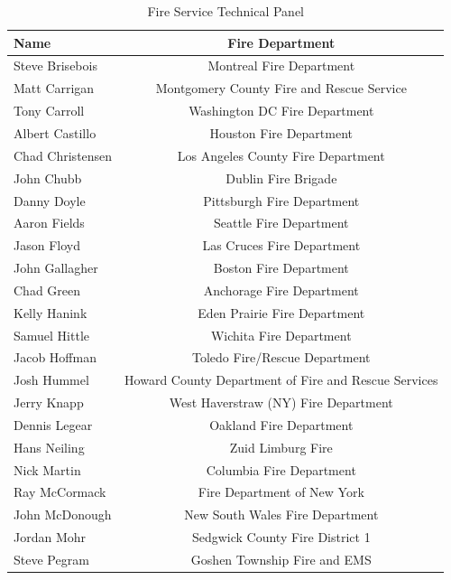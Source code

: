 \documentclass[12pt,oneside]{book}
\begin{document}
\begin{table}[!ht]
	\centering
	\caption*{Fire Service Technical Panel}
	\begin{tabular}{lc}
		\toprule[1.5pt]
		Name & Fire Department \\ 
		\hline
		Steve Brisebois  & Montreal Fire Department \\ 
		Matt Carrigan    & Montgomery County Fire and Rescue Service \\ 
		Tony Carroll     & Washington DC Fire Department \\ 
		Albert Castillo  & Houston Fire Department \\ 
		Chad Christensen & Los Angeles County Fire Department \\ 
		John Chubb       & Dublin Fire Brigade \\ 		 		  
		Danny Doyle      & Pittsburgh Fire Department \\ 
		Aaron Fields     & Seattle Fire Department \\ 
		Jason Floyd      & Las Cruces Fire Department \\ 
		John Gallagher   & Boston Fire Department \\ 
		Chad Green       & Anchorage Fire Department \\ 
		Kelly Hanink     & Eden Prairie Fire Department \\ 
		Samuel Hittle    & Wichita Fire Department \\ 
		Jacob Hoffman    & Toledo Fire/Rescue Department \\ 
		Josh Hummel      & Howard County Department of Fire and Rescue Services \\ 
		Jerry Knapp      & West Haverstraw (NY) Fire Department \\ 
		Dennis Legear    & Oakland Fire Department \\ 
		Hans Neiling     & Zuid Limburg Fire \\ 
		Nick Martin      & Columbia Fire Department \\ 
		Ray McCormack    & Fire Department of New York \\ 
		John McDonough   & New South Wales Fire Department \\ 
		Jordan Mohr      & Sedgwick County Fire District 1 \\ 
		Steve Pegram     & Goshen Township Fire and EMS \\ 
		\bottomrule[1.25pt]
	\end{tabular}
\end{table}
\end{document}
